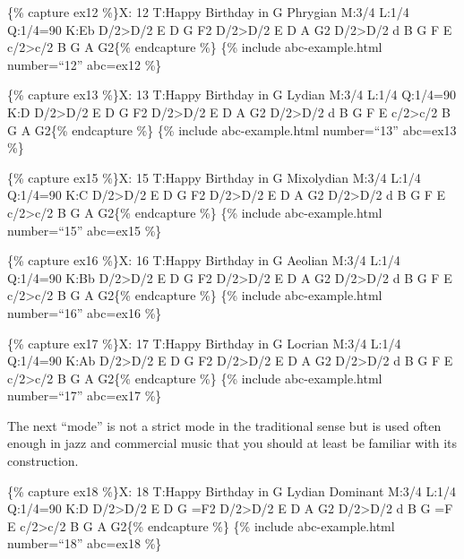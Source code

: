 \documentclass{book}
\begin{document}
\{\% capture ex12 \%\}X: 12 T:Happy Birthday in G Phrygian M:3/4 L:1/4
Q:1/4=90 K:Eb D/2\textgreater D/2\textbar{} E D G\textbar{} F2
D/2\textgreater D/2\textbar{} E D A\textbar{} G2 D/2\textgreater D/2\textbar{}
d B G\textbar{} F E c/2\textgreater c/2\textbar{} B G A\textbar{}
G2\textbar{]}\{\% endcapture \%\} \{\% include abc-example.html number=``12''
abc=ex12 \%\}

\{\% capture ex13 \%\}X: 13 T:Happy Birthday in G Lydian M:3/4 L:1/4 Q:1/4=90
K:D D/2\textgreater D/2\textbar{} E D G\textbar{} F2
D/2\textgreater D/2\textbar{} E D A\textbar{} G2 D/2\textgreater D/2\textbar{}
d B G\textbar{} F E c/2\textgreater c/2\textbar{} B G A\textbar{}
G2\textbar{]}\{\% endcapture \%\} \{\% include abc-example.html number=``13''
abc=ex13 \%\}

\{\% capture ex15 \%\}X: 15 T:Happy Birthday in G Mixolydian M:3/4 L:1/4
Q:1/4=90 K:C D/2\textgreater D/2\textbar{} E D G\textbar{} F2
D/2\textgreater D/2\textbar{} E D A\textbar{} G2 D/2\textgreater D/2\textbar{}
d B G\textbar{} F E c/2\textgreater c/2\textbar{} B G A\textbar{}
G2\textbar{]}\{\% endcapture \%\} \{\% include abc-example.html number=``15''
abc=ex15 \%\}

\{\% capture ex16 \%\}X: 16 T:Happy Birthday in G Aeolian M:3/4 L:1/4 Q:1/4=90
K:Bb D/2\textgreater D/2\textbar{} E D G\textbar{} F2
D/2\textgreater D/2\textbar{} E D A\textbar{} G2 D/2\textgreater D/2\textbar{}
d B G\textbar{} F E c/2\textgreater c/2\textbar{} B G A\textbar{}
G2\textbar{]}\{\% endcapture \%\} \{\% include abc-example.html number=``16''
abc=ex16 \%\}

\{\% capture ex17 \%\}X: 17 T:Happy Birthday in G Locrian M:3/4 L:1/4 Q:1/4=90
K:Ab D/2\textgreater D/2\textbar{} E D G\textbar{} F2
D/2\textgreater D/2\textbar{} E D A\textbar{} G2 D/2\textgreater D/2\textbar{}
d B G\textbar{} F E c/2\textgreater c/2\textbar{} B G A\textbar{}
G2\textbar{]}\{\% endcapture \%\} \{\% include abc-example.html number=``17''
abc=ex17 \%\}

The next ``mode'' is not a strict mode in the traditional sense but is used
often enough in jazz and commercial music that you should at least be familiar
with its construction.

\{\% capture ex18 \%\}X: 18 T:Happy Birthday in G Lydian Dominant M:3/4 L:1/4
Q:1/4=90 K:D D/2\textgreater D/2\textbar{} E D G\textbar{} =F2
D/2\textgreater D/2\textbar{} E D A\textbar{} G2 D/2\textgreater D/2\textbar{}
d B G\textbar{} =F E c/2\textgreater c/2\textbar{} B G A\textbar{}
G2\textbar{]}\{\% endcapture \%\} \{\% include abc-example.html number=``18''
abc=ex18 \%\}
\end{document}
